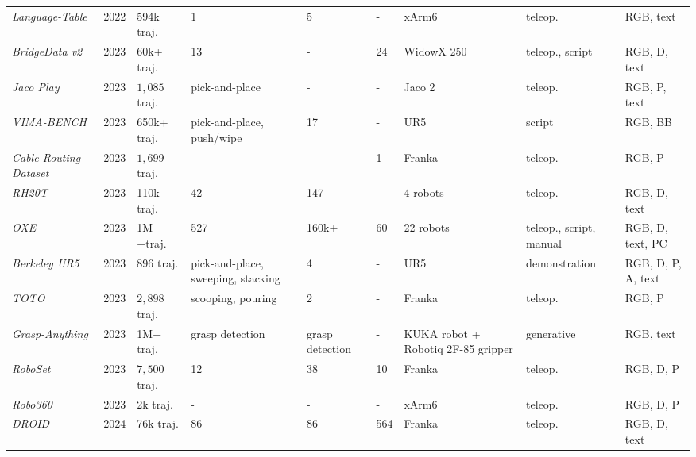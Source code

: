 \begin{table}[!ht]
\begin{tabular}{l p{0.7cm} p{1.8cm} p{1.7cm} p{1.2cm} p{1.2cm} p{1.5cm} p{1.7cm} p{1.5cm}}
    \textit{Language-Table} \cite{Language-Table}& 2022 & 594k traj. 
    & 1 & 5 & - & xArm6 & teleop. & RGB, text \\
    
    \textit{BridgeData v2} \cite{BridgeData_V2}& 2023 & 60k+ traj. 
    & 13 & - & 24 & WidowX 250 & teleop., script & RGB, D, text \\

    \textit{Jaco Play} \cite{Jaco-Play}& 2023 & $1,085$ traj. 
    & pick-and-place & - & - & Jaco 2 & teleop. & RGB, P, text \\

    \textit{VIMA-BENCH} \cite{VIMA-Bench}& 2023 & 650k+ traj. 
    & pick-and-place, push/wipe & 17 & - & UR5 & script & RGB, BB \\

    \textit{Cable Routing Dataset} \cite{Cable-Routing-Dataset}& 2023 & $1,699$ traj. 
    & - & - & 1 & Franka & teleop. & RGB, P \\

    \textit{RH20T} \cite{RH20T}& 2023 & 110k traj. 
    & 42 & 147 & - & 4 robots & teleop. & RGB, D, text \\
    
    \textit{OXE} \cite{OXE}& 2023 & 1M +traj. 
    & 527 & 160k+ & 60 & 22 robots & teleop., script, manual & RGB, D, text, PC \\

    \textit{Berkeley UR5} \cite{BerkeleyUR5Website}& 2023 & 896 traj. 
    & pick-and-place, sweeping, stacking & 4 & - & UR5 & demonstration & RGB, D, P, A, text \\

    \textit{TOTO} \cite{TOTO}& 2023 & $2,898$ traj. 
    & scooping, pouring & 2 & - & Franka & teleop. & RGB, P \\

    \textit{Grasp-Anything} \cite{Grasp-Anything}& 2023 & 1M+ traj. 
    & grasp detection & grasp detection & - & KUKA robot + Robotiq 2F-85 gripper & generative & RGB, text \\
    
    \textit{RoboSet} \cite{RoboSet}& 2023 & $7,500$ traj. 
    & 12 & 38 & 10 & Franka & teleop. & RGB, D, P \\
    
    \textit{Robo360} \cite{Robo360}& 2023 & 2k traj. 
    & - & - & - & xArm6 & teleop. & RGB, D, P \\
    
    \textit{DROID} \cite{DROID}& 2024 & 76k traj. 
    & 86 & 86 & 564 & Franka & teleop. & RGB, D, text \\
    

\end{tabular}
\end{table}
